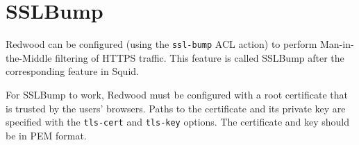 \documentclass{article}
\begin{document}
\section{SSLBump}

Redwood can be configured (using the \verb"ssl-bump" ACL action) to perform Man-in-the-Middle filtering of HTTPS traffic.
This feature is called SSLBump after the corresponding feature in Squid.

For SSLBump to work, Redwood must be configured with a root certificate that is trusted
by the users' browsers.
Paths to the certificate and its private key are specified with the \verb"tls-cert" and \verb"tls-key"
options.
The certificate and key should be in PEM format.
\end{document}
